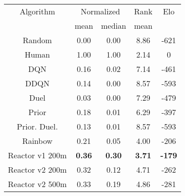 \begin{tabular}{| c | c c | c | c |}
\hline
Algorithm & \multicolumn{2}{|c|}{Normalized} & Rank & Elo \\
 & \scriptsize{mean} & \scriptsize{median} & \scriptsize{mean} & \\
\hline
Random & 0.00 & 0.00 & 8.86 & -621\\
Human & 1.00 & 1.00 & 2.14 & 0\\
DQN & 0.16 & 0.02 & 7.14 & -461\\
DDQN & 0.14 & 0.00 & 8.57 & -593\\
Duel & 0.03 & 0.00 & 7.29 & -479\\
Prior & 0.18 & 0.01 & 6.29 & -397\\
Prior. Duel. & 0.13 & 0.01 & 8.57 & -593\\
Rainbow & 0.21 & 0.05 & 4.00 & -206\\
Reactor v1 200m & {\bf 0.36} & {\bf 0.30} & {\bf 3.71} & {\bf -179}\\
Reactor v2 200m & 0.32 & 0.12 & 4.71 & -262\\
Reactor v2 500m & 0.33 & 0.19 & 4.86 & -281\\
\hline
\end{tabular}
